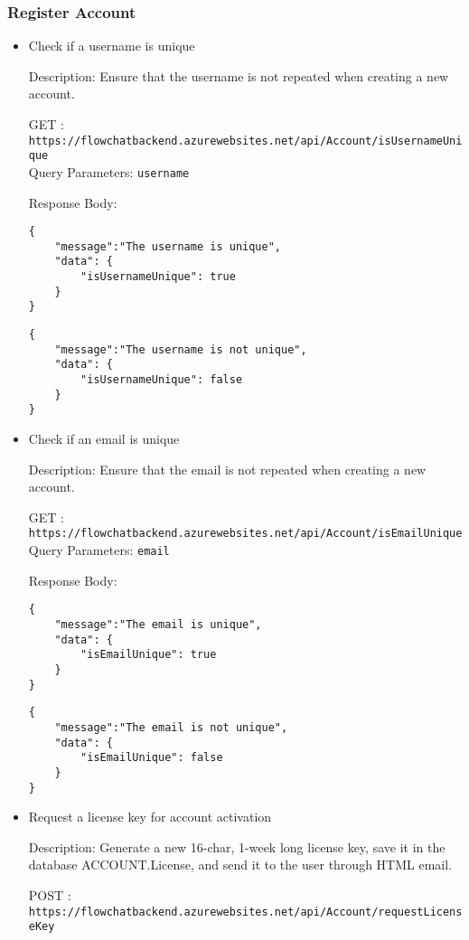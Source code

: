 \documentclass[11pt, a4paper]{article}
\begin{document}
\subsubsection{Register Account}
\begin{itemize}
\item Check if a username is unique

Description: Ensure that the username is not repeated when creating a new account.

GET :  \texttt{https://flowchatbackend.azurewebsites.net/api/Account/isUsernameUnique}\\
Query Parameters: \verb|username| 
    
Response Body:
    \begin{lstlisting}[breaklines=true, frame=single]
{
    "message":"The username is unique",
    "data": {
        "isUsernameUnique": true
    }
}
    \end{lstlisting}
    \begin{lstlisting}[breaklines=true, frame=single]
{
    "message":"The username is not unique",
    "data": {
        "isUsernameUnique": false
    }
}
    \end{lstlisting}

\item Check if an email is unique

Description: Ensure that the email is not repeated when creating a new account.

GET :  \texttt{https://flowchatbackend.azurewebsites.net/api/Account/isEmailUnique} \\
Query Parameters: \verb|email| 
    
Response Body:
    \begin{lstlisting}[breaklines=true, frame=single]
{
    "message":"The email is unique",
    "data": {
        "isEmailUnique": true
    }
}
    \end{lstlisting}
    \begin{lstlisting}[breaklines=true, frame=single]
{
    "message":"The email is not unique",
    "data": {
        "isEmailUnique": false
    }
}
    \end{lstlisting}

\item Request a license key for account activation

Description: Generate a new 16-char, 1-week long license key, save it in the database ACCOUNT.License, and send it to the user through HTML email.

POST :  \texttt{https://flowchatbackend.azurewebsites.net/api/Account/requestLicenseKey}
    

\end{itemize}
\end{document}
